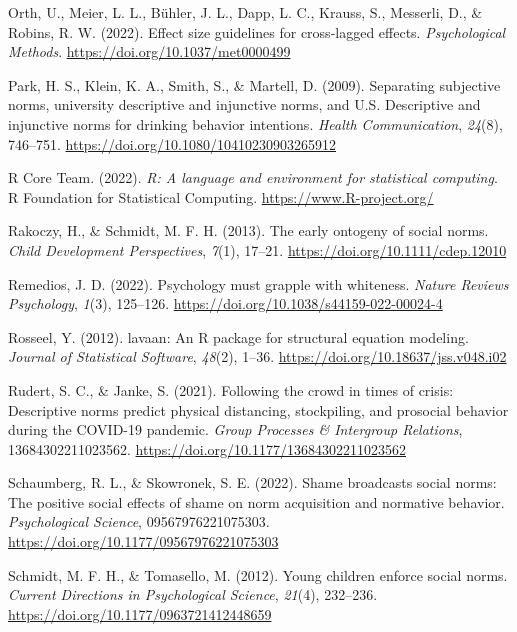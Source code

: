 \documentclass[
  english,
  man,floatsintext]{apa6}
\newlength{\cslhangindent}
\newlength{\cslentryspacingunit} %
\newenvironment{CSLReferences}[2] %
 {%
  \setlength{\parindent}{0pt}
  \ifodd #1
  \let\oldpar\par
  \def\par{\hangindent=\cslhangindent\oldpar}
  \fi
  \setlength{\parskip}{#2\cslentryspacingunit}
 }%
 {}
\begin{document}
\begin{CSLReferences}{1}{0}
\leavevmode{}%
Orth, U., Meier, L. L., Bühler, J. L., Dapp, L. C., Krauss, S., Messerli, D., \& Robins, R. W. (2022). Effect size guidelines for cross-lagged effects. \emph{Psychological Methods}. \url{https://doi.org/10.1037/met0000499}

\leavevmode{}%
Park, H. S., Klein, K. A., Smith, S., \& Martell, D. (2009). Separating subjective norms, university descriptive and injunctive norms, and {U.S.} Descriptive and injunctive norms for drinking behavior intentions. \emph{Health Communication}, \emph{24}(8), 746--751. \url{https://doi.org/10.1080/10410230903265912}

\leavevmode{}%
R Core Team. (2022). \emph{R: A language and environment for statistical computing}. R Foundation for Statistical Computing. \url{https://www.R-project.org/}

\leavevmode{}%
Rakoczy, H., \& Schmidt, M. F. H. (2013). The early ontogeny of social norms. \emph{Child Development Perspectives}, \emph{7}(1), 17--21. \url{https://doi.org/10.1111/cdep.12010}

\leavevmode{}%
Remedios, J. D. (2022). Psychology must grapple with whiteness. \emph{Nature Reviews Psychology}, \emph{1}(3), 125--126. \url{https://doi.org/10.1038/s44159-022-00024-4}

\leavevmode{}%
Rosseel, Y. (2012). {lavaan}: An {R} package for structural equation modeling. \emph{Journal of Statistical Software}, \emph{48}(2), 1--36. \url{https://doi.org/10.18637/jss.v048.i02}

\leavevmode{}%
Rudert, S. C., \& Janke, S. (2021). Following the crowd in times of crisis: Descriptive norms predict physical distancing, stockpiling, and prosocial behavior during the {COVID-19} pandemic. \emph{Group Processes \& Intergroup Relations}, 13684302211023562. \url{https://doi.org/10.1177/13684302211023562}

\leavevmode{}%
Schaumberg, R. L., \& Skowronek, S. E. (2022). Shame broadcasts social norms: The positive social effects of shame on norm acquisition and normative behavior. \emph{Psychological Science}, 09567976221075303. \url{https://doi.org/10.1177/09567976221075303}

\leavevmode{}%
Schmidt, M. F. H., \& Tomasello, M. (2012). Young children enforce social norms. \emph{Current Directions in Psychological Science}, \emph{21}(4), 232--236. \url{https://doi.org/10.1177/0963721412448659}


\end{CSLReferences}
\end{document}
